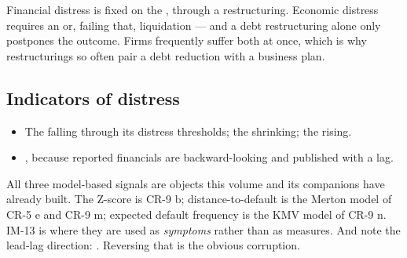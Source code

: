 \begin{imkeybox}
Financial distress is fixed on the ,
through a restructuring. Economic distress requires an  or,
failing that, liquidation --- and a debt restructuring alone only postpones the
outcome. Firms frequently suffer both at once, which is why restructurings so
often pair a debt reduction with a business plan.
\end{imkeybox}

\subsection{Indicators of distress}

\begin{itemize}
\item {} The  falling through its
distress thresholds; the  shrinking; the
 rising.
\item {}, because reported financials are backward-looking and published with a
lag.
\end{itemize}

\begin{imtrapbox}[breakable=false,title={Three readings converge here}]
All three model-based signals are objects this volume and its companions have
already built. The Z-score is CR-9 b; distance-to-default is the Merton model of
CR-5 e and CR-9 m; expected default frequency is the KMV model of CR-9 n. IM-13
is where they are used as \emph{symptoms} rather than as measures. And note the
lead-lag direction: . Reversing that
is the obvious corruption.
\end{imtrapbox}


